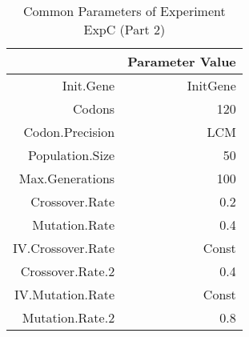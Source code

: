 \begin{table}[ht]
\centering
\begin{tabular}{rr}
  \hline
 & Parameter Value \\ 
  \hline
Init.Gene & InitGene \\ 
  Codons & 120 \\ 
  Codon.Precision & LCM \\ 
  Population.Size & 50 \\ 
  Max.Generations & 100 \\ 
  Crossover.Rate & 0.2 \\ 
  Mutation.Rate & 0.4 \\ 
  IV.Crossover.Rate & Const \\ 
  Crossover.Rate.2 & 0.4 \\ 
  IV.Mutation.Rate & Const \\ 
  Mutation.Rate.2 & 0.8 \\ 
   \hline
\end{tabular}
\caption{Common Parameters of Experiment ExpC (Part 2)} 
\end{table}
